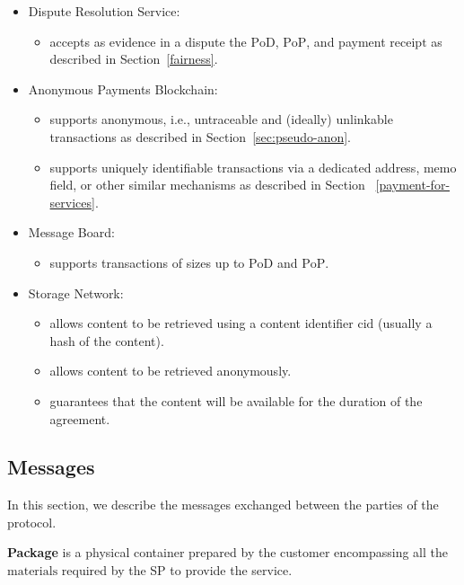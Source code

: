 \documentclass[pdftex,twocolumn,epjc3]{svjour3}
\begin{document}
{\begin{itemize}
\item Dispute Resolution Service:
    \begin{itemize}
        \item accepts as evidence in a dispute the $\mathrm{PoD}$, $\mathrm{PoP}$, and payment $\mathrm{receipt}$ as described in Section~\ref{fairness}.
    \end{itemize}

\item Anonymous Payments Blockchain:
    \begin{itemize}
        \item supports anonymous, i.e., untraceable and (ideally) unlinkable transactions as described in Section~\ref{sec:pseudo-anon}.
        \item supports uniquely identifiable transactions via a dedicated address, memo field, or other similar mechanisms as described in Section ~\ref{payment-for-services}. 
    \end{itemize}

\item Message Board:
    \begin{itemize}
        \item supports transactions of sizes up to $\mathrm{PoD}$ and $\mathrm{PoP}$.
    \end{itemize}

\item Storage Network:
    \begin{itemize}
        \item allows content to be retrieved using a content identifier $\mathrm{cid}$ (usually a hash of the content).
        \item allows content to be retrieved anonymously.
        \item guarantees that the content will be available for the duration of the agreement.
    \end{itemize}
\end{itemize}

\subsection{Messages}\label{messages}
In this section, we describe the messages exchanged between the parties of the protocol.

\vspace{5mm}

\noindent \textbf
{Package}\label{package} is a physical container prepared by the customer encompassing all the $\mathrm{materials}$ required by the SP to provide the service.

}
\end{document}
